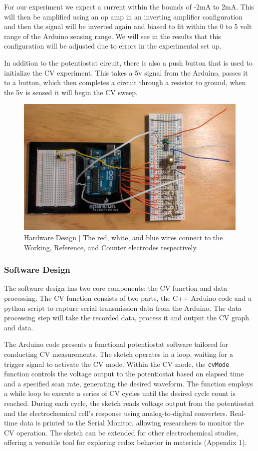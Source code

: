 \documentclass{article}
\begin{document}
For our experiment we expect a current within the bounds of -2mA to 2mA. This will then be amplified using an op amp in an inverting amplifier configuration and then the signal will be inverted again and biased to fit within the 0 to 5 volt range of the Arduino sensing range. We will see in the results that this configuration will be adjusted due to errors in the experimental set up.


In addition to the potentiostat circuit, there is also a push button that is used to initialize the CV experiment. This takes a 5v signal from the Arduino, passes it to a button, which then completes a circuit through a resistor to ground, when the 5v is sensed it will begin the CV sweep.


\begin{figure}[H]
\centering
\includegraphics[width=.9\linewidth]{hardware_design.png}
\caption{Hardware Design | The red, white, and blue wires connect to the Working, Reference, and Counter electrodes respectively.}
\end{figure}


\subsubsection*{Software Design}


The software design has two core components: the CV function and data processing. The CV function consists of two parts, the C++ Arduino code and a python script to capture serial transmission data from the Arduino. The data processing step will take the recorded data, process it and output the CV graph and data.


The Arduino code presents a functional potentiostat software tailored for conducting CV measurements. The sketch operates in a loop, waiting for a trigger signal to activate the CV mode. Within the CV mode, the \texttt{cvMode} function controls the voltage output to the potentiostat based on elapsed time and a specified scan rate, generating the desired waveform. The function employs a while loop to execute a series of CV cycles until the desired cycle count is reached. During each cycle, the sketch reads voltage output from the potentiostat and the electrochemical cell's response using analog-to-digital converters. Real-time data is printed to the Serial Monitor, allowing researchers to monitor the CV operation. The sketch can be extended for other electrochemical studies, offering a versatile tool for exploring redox behavior in materials (Appendix 1).
\end{document}
